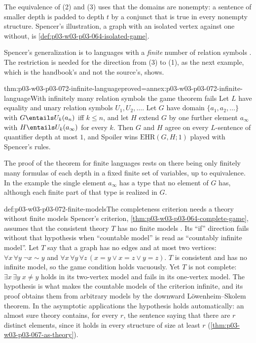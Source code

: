 The equivalence of (2) and (3) uses that the domains are nonempty: a
sentence of smaller depth is padded to depth \(t\) by a conjunct that is
true in every nonempty structure.  Spencer's illustration, a graph with an
isolated vertex against one without, is
\cref{def:p03-w03-p03-064-isolated-game}.

Spencer's generalization is to languages with a \emph{finite} number of
relation symbols \cite[p.~27]{Spencer2007LogicRandomStructuresAuthor}.  The
restriction is needed for the direction from (3) to (1), as the next
example, which is the handbook's and not the source's, shows.

\begin{hbtheorem}{thm:p03-w03-p03-072-infinite-language}{proved=annex:p03-w03-p03-072-infinite-language}{With infinitely many relation symbols the game theorem fails}
Let \(L\) have equality and unary relation symbols \(U_1,U_2,\ldots\).  Let
\(G\) have domain \(\{a_1,a_2,\ldots\}\) with \(G\entails U_k(a_n)\) iff
\(k\leq n\), and let \(H\) extend \(G\) by one further element
\(a_\infty\) with \(H\entails U_k(a_\infty)\) for every \(k\).  Then \(G\)
and \(H\) agree on every \(L\)-sentence of quantifier depth at most \(1\),
and Spoiler wins \(\mathrm{EHR}(G,H;1)\) played with Spencer's rules.
\end{hbtheorem}

The proof of the theorem for finite languages rests on there being only
finitely many formulas of each depth in a fixed finite set of variables, up
to equivalence.  In the example the single element \(a_\infty\) has a type
that no element of \(G\) has, although each finite part of that type is
realized in \(G\).

\begin{hbwarning}{def:p03-w03-p03-072-finite-models}{The completeness criterion needs a theory without finite models}
Spencer's criterion, \cref{thm:p03-w03-p03-064-complete-game}, assumes that
the consistent theory \(T\) has no finite models
\cite[p.~27]{Spencer2007LogicRandomStructuresAuthor}.  Its ``if'' direction
fails without that hypothesis when ``countable model'' is read as
``countably infinite model''.  Let \(T\) say that a graph has no edges and
at most two vertices:
\(\forall x\,\forall y\;\neg x\sim y\) and
\(\forall x\,\forall y\,\forall z\,(x=y\lor x=z\lor y=z)\).  \(T\) is
consistent and has no infinite model, so the game condition holds
vacuously.  Yet \(T\) is not complete: \(\exists x\,\exists y\;x\neq y\)
holds in its two-vertex model and fails in its one-vertex model.  The
hypothesis is what makes the countable models of the criterion infinite,
and its proof obtains them from arbitrary models by the downward
L\"owenheim--Skolem theorem.  In the asymptotic applications the hypothesis
holds automatically: an almost sure theory contains, for every \(r\), the
sentence saying that there are \(r\) distinct elements, since it holds in
every structure of size at least \(r\)
\cite[p.~13]{Spencer2007LogicRandomStructuresAuthor}
(\cref{thm:p03-w03-p03-067-as-theory}).
\end{hbwarning}

